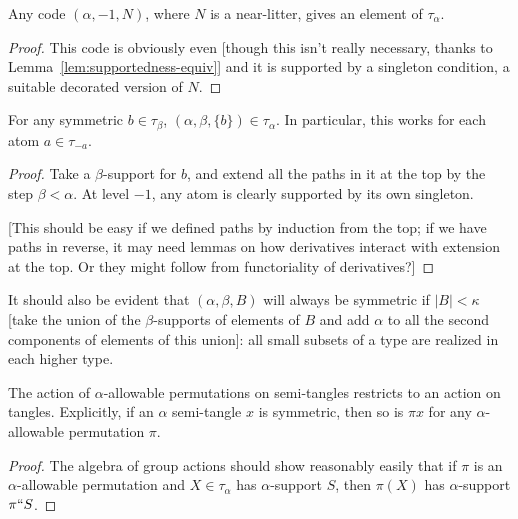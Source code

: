 \begin{lemma}
\label{def:typed-near-litter}
\leanok
Any code $(\alpha,-1,N)$, where $N$ is a near-litter, gives an element of $\tau_\alpha$.
\end{lemma}

\begin{proof}
This code is obviously even [though this isn’t really necessary, thanks to Lemma~\ref{lem:supportedness-equiv}] and it is supported by a singleton condition, a suitable decorated version of $N$.
\end{proof}

\begin{lemma}
\label{def:typed-singleton}
\leanok
For any symmetric $b \in \tau_\beta$, $(\alpha,\beta,\{b\}) \in \tau_\alpha$. In particular, this works for each atom $a \in \tau_{-a}$.
\end{lemma}

\begin{proof}
Take a $\beta$-support for $b$, and extend all the paths in it at the top by the step $\beta < \alpha$.  At level $-1$, any atom is clearly supported by its own singleton.

[This should be easy if we defined paths by induction from the top; if we have paths in reverse, it may need lemmas on how derivatives interact with extension at the top.  Or they might follow from functoriality of derivatives?]
\end{proof}

\begin{lemma}
\label {lem:small-subsets-closure}
\leanok
It should also be evident that $(\alpha,\beta,B)$ will always be symmetric if $|B|<\kappa$ [take the union of the $\beta$-supports of elements of $B$ and add $\alpha$ to all the second components of elements of this union]:  all small subsets of a type are realized in each higher type.
\end{lemma}

\begin{lemma}
  \label{lem:tangle-action}
  \leanok
  The action of $\alpha$-allowable permutations on semi-tangles restricts to an action on tangles.  Explicitly, if an $\alpha$ semi-tangle $x$ is symmetric, then so is $\pi x$ for any $\alpha$-allowable permutation $\pi$.
\end{lemma}
\begin{proof}
  The algebra of group actions should show reasonably easily that if $\pi$ is an $\alpha$-allowable permutation and $X \in \tau_\alpha$ has $\alpha$-support $S$, then $\pi(X)$ has $\alpha$-support $\pi``S$.
\end{proof}

